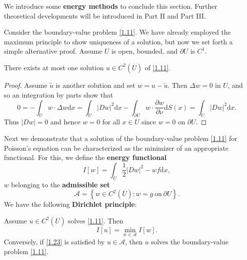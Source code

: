 We introduce some \textbf{energy methods} to conclude this section. Further theoretical developments will be introduced in Part II and Part III.\par
Consider the boundary-value problem \eqref{1.11}. We have already employed the maximum principle to show uniqueness of a solution, but now we set forth a simple alternative proof. Assume $U$ is open, bounded, and $\partial U$ is $C^1$.
\begin{theorem}\label{Thm1.2.24}
There exists at most one solution $u\in C^2(\overline{U})$ of \eqref{1.11}.
\end{theorem}
\begin{proof}
Assume $\widetilde{u}$ is another solution and set $w=u-\widetilde{u}$. Then $\Delta w=0$ in $U$, and so an integration by parts show that 
$$
0=-\int_U{w\cdot \Delta w\mathrm{d}x}=\int_U{\left| Dw \right|^2\mathrm{d}x}-\int_{\partial U}{w\cdot \frac{\partial w}{\partial \nu}\mathrm{d}S\left( x \right)}=\int_U{\left| Dw \right|^2\mathrm{d}x}.
$$
Thus $|Dw|=0$ and hence $w=0$ for all $x\in U$ since $w=0$ on $\partial U$.
\end{proof}
Next we demonstrate that a solution of the boundary-value problem \eqref{1.11} for Poisson's equation can be characterized as the minimizer of an appropriate functional. For this, we define the \textbf{energy functional}
$$
I\left[ w \right] =\int_U{\frac{1}{2}\left| Dw \right|^2-wf\mathrm{d}x},
$$
$w$ belonging to the \textbf{admissible set}
$$
\mathcal{A} =\left\{ w\in C^2\left( \overline{U} \right) :w=g\ \text{on}\ \partial U \right\} .
$$
We have the following \textbf{Dirichlet principle}: 
\begin{theorem}
Assume $u\in C^2(\overline{U})$ solves \eqref{1.11}. Then 
\begin{equation}\label{1.23}
I\left[ u \right] =\min_{w\in \mathcal{A}} I\left[ w \right] .
\end{equation}
Conversely, if \eqref{1.23} is satisfied by $u\in\mathcal{A}$, then $u$ solves the boundary-value problem \eqref{1.11}.
\end{theorem}
